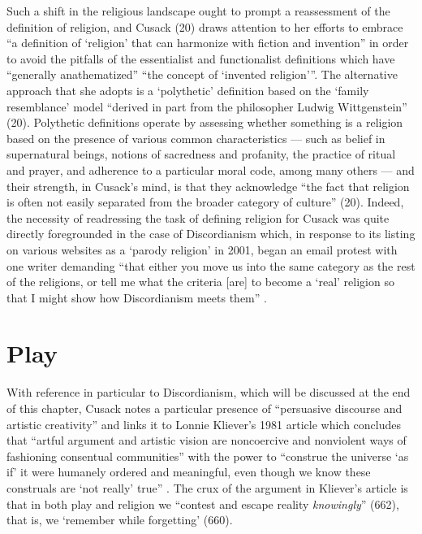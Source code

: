 \documentclass[Draft.tex]{subfiles}
\begin{document}
Such a shift in the religious landscape ought to prompt a reassessment of
the definition of religion, and Cusack (20) draws attention to her efforts to
embrace ``a definition of `religion' that can
harmonize with fiction and invention'' in order to avoid the pitfalls
of the essentialist and functionalist definitions
which have ``generally anathematized''
``the concept of `invented religion'\thinspace''.
The alternative approach that she adopts is a `polythetic' definition
based on the `family resemblance' model ``derived in part from the philosopher
Ludwig Wittgenstein'' (20).
Polythetic definitions operate by assessing whether something is a religion
based on the presence of various common characteristics --- such as
belief in supernatural beings, notions of sacredness and profanity,
the practice of ritual and prayer, and adherence to a particular moral code,
among many others --- and their strength, in Cusack's mind, is that
they acknowledge ``the fact that religion is often not easily separated from
the broader category of culture'' (20).
Indeed, the necessity of readressing the task of defining religion for Cusack
was quite directly foregrounded in the case of Discordianism which,
in response to its listing on various websites as a `parody religion'
in 2001, began an email protest with one writer demanding
``that either you move us into the same category
as the rest of the religions, or tell me what the criteria [are]
to become a `real' religion so that I might show
how Discordianism meets them'' \parencite[209]{Chidester05}.


\section*{Play}
With reference in particular to Discordianism,
which will be discussed at the end of this chapter,
Cusack \parencite*[23]{Cusack10} notes a particular presence of
``persuasive discourse and artistic creativity'' and links it to
Lonnie Kliever's 1981 article which concludes that
``artful argument and artistic vision are noncoercive and nonviolent ways
of fashioning consentual communities'' with the power to
``construe the universe `as if' it were humanely ordered and meaningful,
even though we know these construals are
`not really' true'' \parencite[665]{Kliever81}.
The crux of the argument in Kliever's article is that
in both play and religion we
``contest and escape reality \textit{knowingly}'' (662),
that is, we `remember while forgetting' (660).
\end{document}

